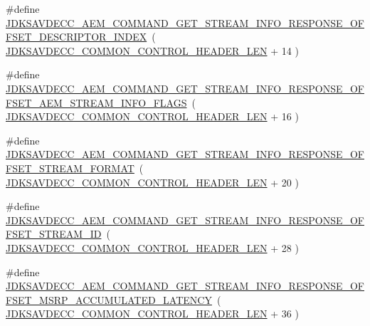 \begin{DoxyCompactItemize}
\item 
\#define \hyperlink{group__command__get__stream__info__response_ga1cc7996cadc5cdf926c1f508a9a4e316}{J\+D\+K\+S\+A\+V\+D\+E\+C\+C\+\_\+\+A\+E\+M\+\_\+\+C\+O\+M\+M\+A\+N\+D\+\_\+\+G\+E\+T\+\_\+\+S\+T\+R\+E\+A\+M\+\_\+\+I\+N\+F\+O\+\_\+\+R\+E\+S\+P\+O\+N\+S\+E\+\_\+\+O\+F\+F\+S\+E\+T\+\_\+\+D\+E\+S\+C\+R\+I\+P\+T\+O\+R\+\_\+\+I\+N\+D\+EX}~( \hyperlink{group__jdksavdecc__avtp__common__control__header_gaae84052886fb1bb42f3bc5f85b741dff}{J\+D\+K\+S\+A\+V\+D\+E\+C\+C\+\_\+\+C\+O\+M\+M\+O\+N\+\_\+\+C\+O\+N\+T\+R\+O\+L\+\_\+\+H\+E\+A\+D\+E\+R\+\_\+\+L\+EN} + 14 )
\item 
\#define \hyperlink{group__command__get__stream__info__response_gad451e136263f2d06ea85332a7756d86c}{J\+D\+K\+S\+A\+V\+D\+E\+C\+C\+\_\+\+A\+E\+M\+\_\+\+C\+O\+M\+M\+A\+N\+D\+\_\+\+G\+E\+T\+\_\+\+S\+T\+R\+E\+A\+M\+\_\+\+I\+N\+F\+O\+\_\+\+R\+E\+S\+P\+O\+N\+S\+E\+\_\+\+O\+F\+F\+S\+E\+T\+\_\+\+A\+E\+M\+\_\+\+S\+T\+R\+E\+A\+M\+\_\+\+I\+N\+F\+O\+\_\+\+F\+L\+A\+GS}~( \hyperlink{group__jdksavdecc__avtp__common__control__header_gaae84052886fb1bb42f3bc5f85b741dff}{J\+D\+K\+S\+A\+V\+D\+E\+C\+C\+\_\+\+C\+O\+M\+M\+O\+N\+\_\+\+C\+O\+N\+T\+R\+O\+L\+\_\+\+H\+E\+A\+D\+E\+R\+\_\+\+L\+EN} + 16 )
\item 
\#define \hyperlink{group__command__get__stream__info__response_ga58df48ee81e8f8cc3669eaed955f86c2}{J\+D\+K\+S\+A\+V\+D\+E\+C\+C\+\_\+\+A\+E\+M\+\_\+\+C\+O\+M\+M\+A\+N\+D\+\_\+\+G\+E\+T\+\_\+\+S\+T\+R\+E\+A\+M\+\_\+\+I\+N\+F\+O\+\_\+\+R\+E\+S\+P\+O\+N\+S\+E\+\_\+\+O\+F\+F\+S\+E\+T\+\_\+\+S\+T\+R\+E\+A\+M\+\_\+\+F\+O\+R\+M\+AT}~( \hyperlink{group__jdksavdecc__avtp__common__control__header_gaae84052886fb1bb42f3bc5f85b741dff}{J\+D\+K\+S\+A\+V\+D\+E\+C\+C\+\_\+\+C\+O\+M\+M\+O\+N\+\_\+\+C\+O\+N\+T\+R\+O\+L\+\_\+\+H\+E\+A\+D\+E\+R\+\_\+\+L\+EN} + 20 )
\item 
\#define \hyperlink{group__command__get__stream__info__response_ga39e7fabce365d6785bb1b645ead7cf19}{J\+D\+K\+S\+A\+V\+D\+E\+C\+C\+\_\+\+A\+E\+M\+\_\+\+C\+O\+M\+M\+A\+N\+D\+\_\+\+G\+E\+T\+\_\+\+S\+T\+R\+E\+A\+M\+\_\+\+I\+N\+F\+O\+\_\+\+R\+E\+S\+P\+O\+N\+S\+E\+\_\+\+O\+F\+F\+S\+E\+T\+\_\+\+S\+T\+R\+E\+A\+M\+\_\+\+ID}~( \hyperlink{group__jdksavdecc__avtp__common__control__header_gaae84052886fb1bb42f3bc5f85b741dff}{J\+D\+K\+S\+A\+V\+D\+E\+C\+C\+\_\+\+C\+O\+M\+M\+O\+N\+\_\+\+C\+O\+N\+T\+R\+O\+L\+\_\+\+H\+E\+A\+D\+E\+R\+\_\+\+L\+EN} + 28 )
\item 
\#define \hyperlink{group__command__get__stream__info__response_ga51c1e002d9597ac0643dbfd3b185edc6}{J\+D\+K\+S\+A\+V\+D\+E\+C\+C\+\_\+\+A\+E\+M\+\_\+\+C\+O\+M\+M\+A\+N\+D\+\_\+\+G\+E\+T\+\_\+\+S\+T\+R\+E\+A\+M\+\_\+\+I\+N\+F\+O\+\_\+\+R\+E\+S\+P\+O\+N\+S\+E\+\_\+\+O\+F\+F\+S\+E\+T\+\_\+\+M\+S\+R\+P\+\_\+\+A\+C\+C\+U\+M\+U\+L\+A\+T\+E\+D\+\_\+\+L\+A\+T\+E\+N\+CY}~( \hyperlink{group__jdksavdecc__avtp__common__control__header_gaae84052886fb1bb42f3bc5f85b741dff}{J\+D\+K\+S\+A\+V\+D\+E\+C\+C\+\_\+\+C\+O\+M\+M\+O\+N\+\_\+\+C\+O\+N\+T\+R\+O\+L\+\_\+\+H\+E\+A\+D\+E\+R\+\_\+\+L\+EN} + 36 )

\end{DoxyCompactItemize}
